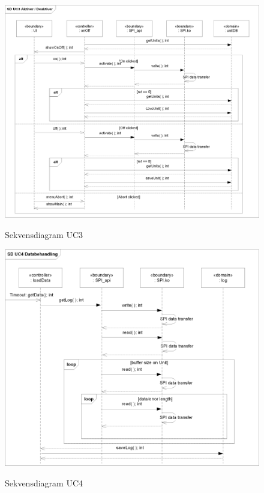 \begin{figure}[htbp] \centering
{\includegraphics[scale=0.8]{filer/design/a_uc3}}
\caption{Sekvensdiagram UC3}
\label{fig:Sekvensdiagram UC3}
\end{figure} 

\begin{figure}[htbp] \centering
{\includegraphics[scale=0.8]{filer/design/a_uc4}}
\caption{Sekvensdiagram UC4}
\label{fig:Sekvensdiagram UC4}
\end{figure} 

